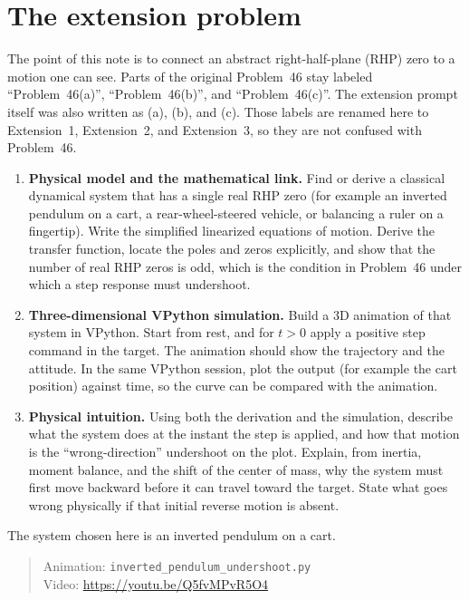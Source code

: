 \documentclass[12pt,a4paper]{article}
\begin{document}
\section*{The extension problem}

The point of this note is to connect an abstract right-half-plane (RHP) zero to a motion one can see.
Parts of the original Problem~46 stay labeled ``Problem~46(a)'', ``Problem~46(b)'', and ``Problem~46(c)''.
The extension prompt itself was also written as (a), (b), and (c).
Those labels are renamed here to Extension~1, Extension~2, and Extension~3, so they are not confused with Problem~46.

\begin{enumerate}
  \item[\textbf{Extension 1.}]
  \textbf{Physical model and the mathematical link.}
  Find or derive a classical dynamical system that has a single real RHP zero
  (for example an inverted pendulum on a cart, a rear-wheel-steered vehicle, or balancing a ruler on a fingertip).
  Write the simplified linearized equations of motion.
  Derive the transfer function, locate the poles and zeros explicitly,
  and show that the number of real RHP zeros is odd, which is the condition in Problem~46 under which a step response must undershoot.

  \item[\textbf{Extension 2.}]
  \textbf{Three-dimensional VPython simulation.}
  Build a 3D animation of that system in VPython.
  Start from rest, and for \(t>0\) apply a positive step command in the target.
  The animation should show the trajectory and the attitude.
  In the same VPython session, plot the output (for example the cart position) against time, so the curve can be compared with the animation.

  \item[\textbf{Extension 3.}]
  \textbf{Physical intuition.}
  Using both the derivation and the simulation, describe what the system does at the instant the step is applied,
  and how that motion is the ``wrong-direction'' undershoot on the plot.
  Explain, from inertia, moment balance, and the shift of the center of mass, why the system must first move backward before it can travel toward the target.
  State what goes wrong physically if that initial reverse motion is absent.
\end{enumerate}

The system chosen here is an inverted pendulum on a cart.
\begin{quote}
Animation: \texttt{inverted\_pendulum\_undershoot.py}\\
Video: \url{https://youtu.be/Q5fvMPvR5O4}
\end{quote}
\end{document}
